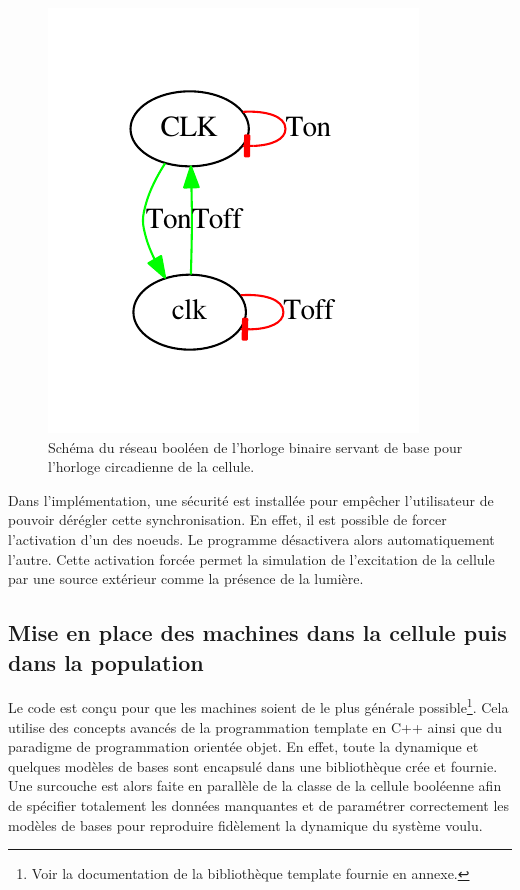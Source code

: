 \documentclass[11pt, a4paper]{article}
\begin{document}
\begin{figure}[position]
    \begin{center}
        \includegraphics[scale=1.0]{bool_net_clock}
        \caption{
            \label{net_clock}
            Schéma du réseau booléen de l'horloge binaire servant de base pour
            l'horloge circadienne de la cellule.
        }
    \end{center}
\end{figure}

Dans l'implémentation, une sécurité est installée pour empêcher l'utilisateur
de pouvoir dérégler cette synchronisation. En effet, il est possible de forcer
l'activation d'un des noeuds. Le programme désactivera alors automatiquement
l'autre. Cette activation forcée permet la simulation de l'excitation de la
cellule par une source extérieur comme la présence de la lumière.

\subsection{Mise en place des machines dans la cellule puis dans la population}
Le code est conçu pour que les machines soient de le plus générale
possible\footnote{Voir la documentation de la bibliothèque template fournie en
annexe.}. Cela utilise des concepts avancés de la programmation template en
C++ ainsi que du paradigme de programmation orientée objet. En effet, toute la
dynamique et quelques modèles de bases sont encapsulé dans une bibliothèque
crée et fournie. Une surcouche est alors faite en parallèle de la classe de la
cellule booléenne afin de spécifier totalement les données manquantes et de
paramétrer correctement les modèles de bases pour reproduire fidèlement la
dynamique du système voulu.
\end{document}
